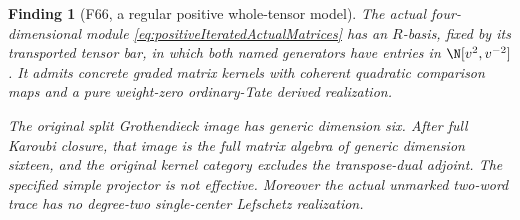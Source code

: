 \documentclass[11pt,a4paper]{article}
\newcommand{\fid}[1]{\textsf{#1}}\newcommand{\gate}[1]{\textsf{#1}}
\theoremstyle{named}\newtheorem{finding}{Finding}[section]
\theoremstyle{definition}\newtheorem{definition}[finding]{Definition}
\theoremstyle{remark}\newtheorem{remark}[finding]{Remark}
\begin{document}
\begin{finding}[\fid{F66}, a regular positive whole-tensor model]
\label{f:iteratedPositiveWholeTensor}
The actual four-dimensional module
\eqref{eq:positiveIteratedActualMatrices} has an
\(R\)-basis, fixed by its transported tensor bar,
in which both named generators have entries in
\(\N[v^2,v^{-2}]\).
It admits concrete graded matrix kernels with coherent
quadratic comparison maps and a pure weight-zero
ordinary-Tate derived realization.

The original split Grothendieck image has generic
dimension six. After full Karoubi closure, that image
is the full matrix algebra of generic dimension
sixteen, and the original kernel category excludes
the transpose-dual adjoint.
The specified simple projector is not effective.
Moreover the actual unmarked two-word trace has no
degree-two single-center Lefschetz realization.
\end{finding}
\end{document}

